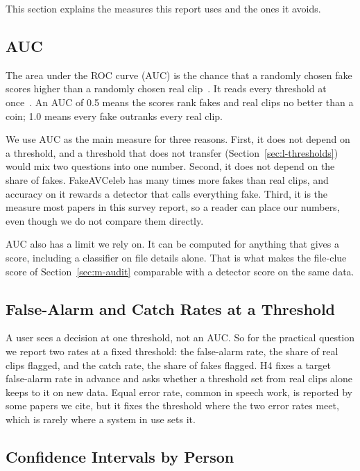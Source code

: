 This section explains the measures this report uses and the ones it
avoids.

\subsection{AUC}

The area under the ROC curve (AUC) is the chance that a randomly chosen fake
scores higher than a randomly chosen real clip~\cite{hanley}. It reads every
threshold at once~\cite{fawcett}. An AUC of 0.5 means the scores rank fakes
and real clips no better than a coin; 1.0 means every fake outranks every real
clip.

We use AUC as the main measure for three reasons. First, it does not depend on
a threshold, and a threshold that does not transfer
(Section~\ref{sec:l-thresholds}) would mix two questions into one number.
Second, it does not depend on the share of fakes. FakeAVCeleb has many times
more fakes than real clips, and accuracy on it rewards a detector that calls
everything fake. Third, it is the measure most papers in this survey report,
so a reader can place our numbers, even though we do not compare them
directly.

AUC also has a limit we rely on. It can be computed for anything that gives a
score, including a classifier on file details alone. That is what makes the
file-clue score of Section~\ref{sec:m-audit} comparable with a detector score
on the same data.

\subsection{False-Alarm and Catch Rates at a Threshold}

A user sees a decision at one threshold, not an AUC. So for the practical
question we report
two rates at a fixed threshold: the false-alarm rate, the share of real clips
flagged, and the catch rate, the share of fakes flagged. H4 fixes a target
false-alarm rate in advance and asks whether a threshold set from real clips
alone keeps to it on new data. Equal error rate, common in speech work, is
reported by some papers we cite, but it fixes the threshold where the two
error rates meet, which is rarely where a system in use sets it.

\subsection{Confidence Intervals by Person}

